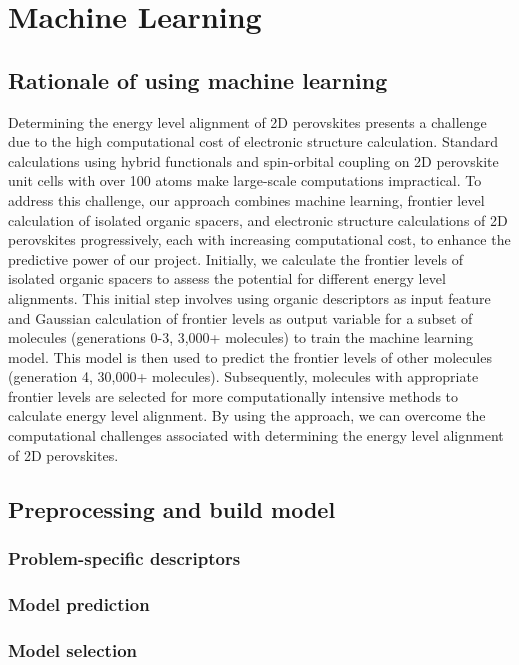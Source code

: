 \chapter[Machine Learning]{Machine Learning}\label{c:tc4}

\section{Rationale of using machine learning}

Determining the energy level alignment of 2D perovskites presents a challenge due to the high computational cost of electronic structure calculation. Standard calculations using hybrid functionals and spin-orbital coupling on 2D perovskite unit cells with over 100 atoms make large-scale computations impractical. To address this challenge, our approach combines machine learning, frontier level calculation of isolated organic spacers, and electronic structure calculations of 2D perovskites progressively, each with increasing computational cost, to enhance the predictive power of our project. Initially, we calculate the frontier levels of isolated organic spacers to assess the potential for different energy level alignments. This initial step involves using organic descriptors as input feature and Gaussian calculation of frontier levels as output variable for a subset of molecules (generations 0-3, 3,000+ molecules) to train the machine learning model. This model is then used to predict the frontier levels of other molecules (generation 4, 30,000+ molecules). Subsequently, molecules with appropriate frontier levels are selected for more computationally intensive methods to calculate energy level alignment. By using the approach, we can overcome the computational challenges associated with determining the energy level alignment of 2D perovskites.

\section{Preprocessing and build model}
\subsection{Problem-specific descriptors}
\subsection{Model prediction}
\subsection{Model selection}

